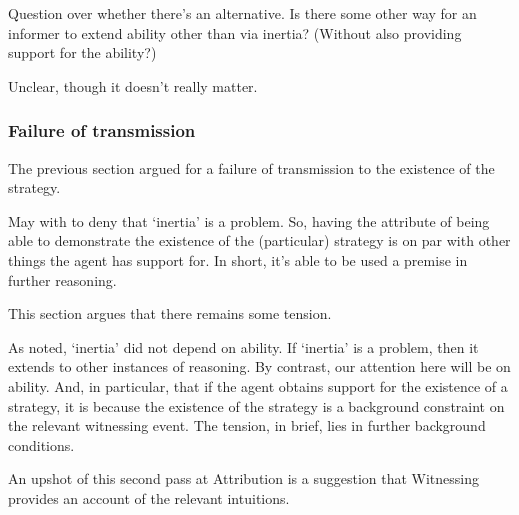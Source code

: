 \documentclass[10pt]{article}
\newcommand{\WR}[0]{\textsf{Witnessing}}
\newcommand{\AR}[0]{\textsf{Attribution}}
\begin{document}
\begin{note}
  Question over whether there's an alternative.
  Is there some other way for an informer to extend ability other than via inertia?
  (Without also providing support for the ability?)

  Unclear, though it doesn't really matter.
\end{note}


\subsubsection{Failure of transmission}
\label{sec:failure-transmission}

\begin{note}
  The previous section argued for a failure of transmission to the existence of the strategy.

  May with to deny that `inertia' is a problem.
  So, having the attribute of being able to demonstrate the existence of the (particular) strategy is on par with other things the agent has support for.
  In short, it's able to be used a premise in further reasoning.

  This section argues that there remains some tension.

  As noted, `inertia' did not depend on ability.
  If `inertia' is a problem, then it extends to other instances of reasoning.
  By contrast, our attention here will be on ability.
  And, in particular, that if the agent obtains support for the existence of a strategy, it is because the existence of the strategy is a background constraint on the relevant witnessing event.
  The tension, in brief, lies in further background conditions.

  An upshot of this second pass at \AR{} is a suggestion that \WR{} provides an account of the relevant intuitions.
\end{note}
\end{document}
